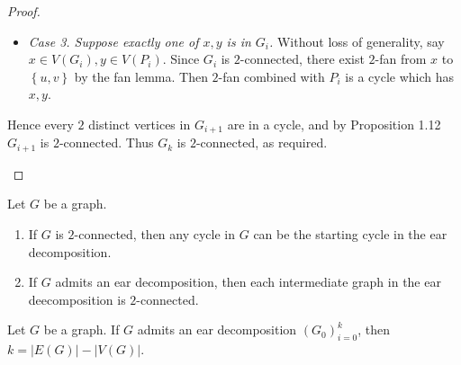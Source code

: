 \documentclass[co342]{subfiles}
\begin{document}
\begin{proof}
\begin{itemize}
\begin{itemize}
                    \item \textit{Case 3. Suppose exactly one of $x,y$ is in $G_i$.} Without loss of generality, say $x\in V\left( G_i \right), y\in V\left( P_i \right)$. Since $G_i$ is $2$-connected, there exist $2$-fan from $x$ to $\left\lbrace u,v \right\rbrace$ by the fan lemma. Then $2$-fan combined with $P_i$ is a cycle which has $x,y$.
                \end{itemize} 
                Hence every $2$ distinct vertices in $G_{i+1}$ are in a cycle, and by Proposition 1.12 $G_{i+1}$ is $2$-connected. Thus $G_k$ is $2$-connected, as required. \qqedsym
        \end{itemize} 
    \end{proof}

    \clearpage
    \begin{cor}{}
        Let $G$ be a graph.
        \begin{enumerate}
            \item If $G$ is $2$-connected, then any cycle in $G$ can be the starting cycle in the ear decomposition.
            \item If $G$ admits an ear decomposition, then each intermediate graph in the ear deecomposition is $2$-connected.
        \end{enumerate}
    \end{cor}

    \begin{prop}{}
        Let $G$ be a graph. If $G$ admits an ear decomposition $\left( G_{0} \right)^{k}_{i=0}$, then $k=\left| E\left( G \right) \right|-\left| V\left( G \right) \right|$.
    \end{prop}


    
    
\end{document}
